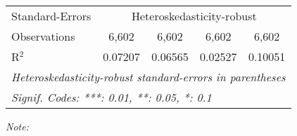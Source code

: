 \begin{table}[htbp!]
\begin{adjustbox}{width = 1\textwidth, max height = 0.95\textheight, center}
\begin{threeparttable}[b]
\begin{tabular}{lcccc}
            \midrule 
            Standard-Errors & \multicolumn{4}{c}{Heteroskedasticity-robust} \\ 
            Observations         & 6,602                           & 6,602                          & 6,602                          & 6,602\\  
            R$^2$                & 0.07207                         & 0.06565                        & 0.02527                        & 0.10051\\  
            \midrule \midrule
            \multicolumn{5}{l}{\emph{Heteroskedasticity-robust standard-errors in parentheses}}\\
            \multicolumn{5}{l}{\emph{Signif. Codes: ***: 0.01, **: 0.05, *: 0.1}}\\
         \end{tabular}
         
         \begin{tablenotes}\item \medskip \textit{Note:}
         \end{tablenotes}
      \end{threeparttable}
   \end{adjustbox}
\end{table}


